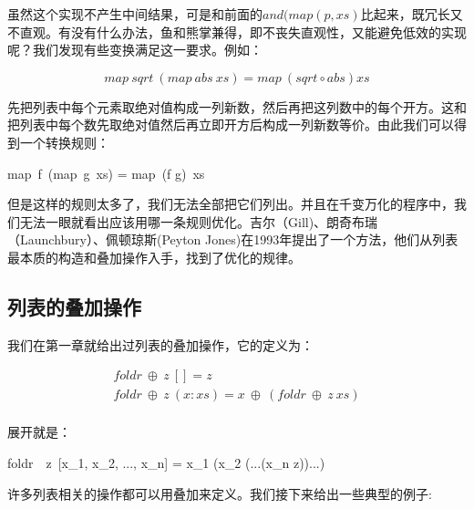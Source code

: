 \documentclass{article}
\begin{document}
虽然这个实现不产生中间结果，可是和前面的$and(map(p, xs)$比起来，既冗长又不直观。有没有什么办法，鱼和熊掌兼得，即不丧失直观性，又能避免低效的实现呢？我们发现有些变换满足这一要求。例如：

\[
map\ sqrt\  (map\ abs\ xs) = map\ (sqrt \circ abs) xs
\]

先把列表中每个元素取绝对值构成一列新数，然后再把这列数中的每个开方。这和把列表中每个数先取绝对值然后再立即开方后构成一列新数等价。由此我们可以得到一个转换规则：

\be
map\ f\ (map\ g\ xs) = map\ (f \circ g)\ xs
\ee

但是这样的规则太多了，我们无法全部把它们列出。并且在千变万化的程序中，我们无法一眼就看出应该用哪一条规则优化。吉尔（Gill)、朗奇布瑞（Launchbury）、佩顿琼斯(Peyton Jones)在1993年提出了一个方法，他们从列表最本质的构造和叠加操作入手，找到了优化的规律。

\subsection{列表的叠加操作}

我们在第一章就给出过列表的叠加操作，它的定义为：

\[
\begin{array}{l}
foldr\ \oplus\ z\ [] = z \\
foldr\ \oplus\ z\ (x:xs) = x\ \oplus\ (foldr\ \oplus\ z\ xs) \\
\end{array}
\]

展开就是：

\be
foldr\ \oplus\ z\ [x_1, x_2, ..., x_n] = x_1 \oplus (x_2 \oplus (...(x_n \oplus z))...)
\ee

许多列表相关的操作都可以用叠加来定义。我们接下来给出一些典型的例子:
\end{document}
